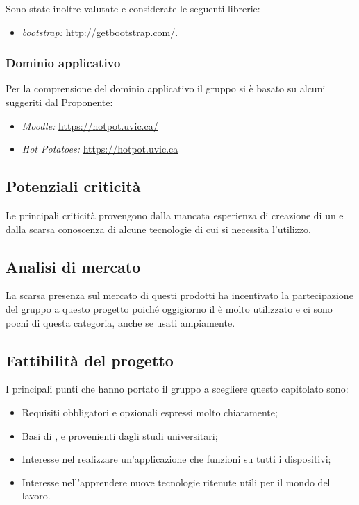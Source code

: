 \documentclass[a4paper, titlepage]{article}
\begin{document}
Sono state inoltre valutate e considerate le seguenti librerie:
\begin{itemize}
	\item \textit{bootstrap:} \href{http://getbootstrap.com/}{http://getbootstrap.com/}.
\end{itemize}

\subsubsection{Dominio applicativo}
Per la comprensione del dominio applicativo il gruppo si è basato su alcuni   suggeriti dal Proponente:

\begin{itemize}
	\item \textit{Moodle:} \href{https://hotpot.uvic.ca/}{https://hotpot.uvic.ca/}
	\item \textit{Hot Potatoes:} \href{https://hotpot.uvic.ca}{https://hotpot.uvic.ca}
\end{itemize}

\subsection{Potenziali criticità}
Le principali criticità provengono dalla mancata esperienza di creazione di un  e dalla scarsa conoscenza di alcune tecnologie di cui si necessita l'utilizzo.
\subsection{Analisi di mercato}
La scarsa presenza sul mercato di questi prodotti ha incentivato la partecipazione del gruppo a questo progetto poiché oggigiorno il  è molto utilizzato e ci sono pochi  di questa categoria, anche se usati ampiamente.
\subsection{Fattibilità del progetto}
I principali punti che hanno portato il gruppo a scegliere questo capitolato sono:
\begin{itemize}
	\item Requisiti obbligatori e opzionali espressi molto chiaramente;
	\item Basi di \textit{}, \textit{} e \textit{} provenienti dagli studi universitari;
	\item Interesse nel realizzare un'applicazione che funzioni su tutti i dispositivi;
	\item Interesse nell'apprendere nuove tecnologie ritenute utili per il mondo del lavoro.
	
\end{itemize}
\end{document}
